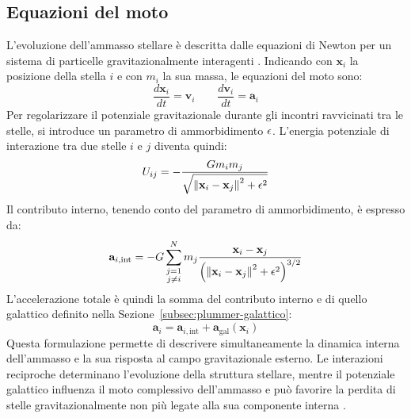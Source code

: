 \subsection{Equazioni del moto}
\label{subsec:equazioni-moto}
L'evoluzione dell'ammasso stellare è descritta dalle equazioni di Newton per un sistema di particelle gravitazionalmente interagenti \cite{goldstein2002}. Indicando con $\mathbf{x}_i$ la posizione della stella $i$ e con $m_i$ la sua massa, le equazioni del moto sono:
\begin{equation}
	\frac{d\mathbf{x}_i}{dt} = \mathbf{v}_i
	\qquad
	\frac{d\mathbf{v}_i}{dt} = \mathbf{a}_i
	\label{eq:equations-of-motion}
\end{equation}
Per regolarizzare il potenziale gravitazionale durante gli incontri ravvicinati tra le stelle, si introduce un parametro di ammorbidimento $\epsilon$. L'energia potenziale di interazione tra due stelle $i$ e $j$ diventa quindi:
\begin{equation}
	U_{ij}=-\frac{G m_i m_j}
	{\sqrt{\left\|\mathbf{x}_i-\mathbf{x}_j\right\|^2+\epsilon^2}}
	\label{eq:softened-potential}
\end{equation}
Il contributo interno, tenendo conto del parametro di ammorbidimento, è espresso da:
\begin{equation}
	\mathbf{a}_{i,\mathrm{int}} =
	-G\sum_{\substack{j=1\\j\neq i}}^N
	m_j
	\frac{\mathbf{x}_i-\mathbf{x}_j}
	{\left(\left\|\mathbf{x}_i-\mathbf{x}_j\right\|^2+\epsilon^2\right)^{3/2}}
	\label{eq:internal-gravitational-acceleration}
\end{equation}
L'accelerazione totale è quindi la somma del contributo interno e di quello galattico definito nella Sezione~\ref{subsec:plummer-galattico}:
\begin{equation}
	\mathbf{a}_i =
	\mathbf{a}_{i,\mathrm{int}} +
	\mathbf{a}_{\mathrm{gal}}(\mathbf{x}_i)
	\label{eq:total-acceleration}
\end{equation}
Questa formulazione permette di descrivere simultaneamente la dinamica interna dell'ammasso e la sua risposta al campo gravitazionale esterno. Le interazioni reciproche determinano l'evoluzione della struttura stellare, mentre il potenziale galattico influenza il moto complessivo dell'ammasso e può favorire la perdita di stelle gravitazionalmente non più legate alla sua componente interna \cite{binneytremaine2008}.
